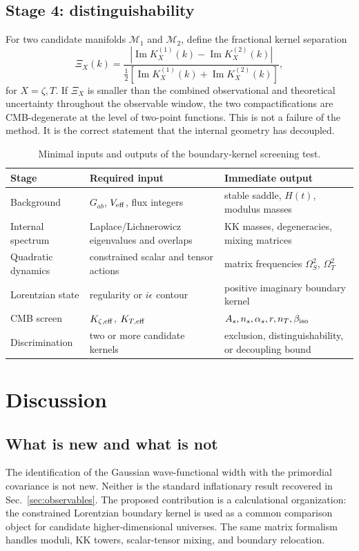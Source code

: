 \documentclass[aps,prd,twocolumn,superscriptaddress,nofootinbib,longbibliography,floatfix]{revtex4-2}
\newcommand{\cM}{\mathcal M}
\begin{document}
\subsection{Stage 4: distinguishability}
For two candidate manifolds $\cM_1$ and $\cM_2$, define the fractional kernel separation
\begin{equation}
\Xi_X(k)=\frac{\left|\operatorname{Im}K_X^{(1)}(k)-
\operatorname{Im}K_X^{(2)}(k)\right|}
{\frac12\left[\operatorname{Im}K_X^{(1)}(k)+
\operatorname{Im}K_X^{(2)}(k)\right]},
\end{equation}
for $X=\zeta,T$. If $\Xi_X$ is smaller than the combined observational and theoretical uncertainty throughout the observable window, the two compactifications are CMB-degenerate at the level of two-point functions. This is not a failure of the method. It is the correct statement that the internal geometry has decoupled.

\begin{table}[tbp]
\caption{Minimal inputs and outputs of the boundary-kernel screening test.}
\begin{ruledtabular}
\begin{tabular}{lll}
Stage & Required input & Immediate output\\
\hline
Background & $G_{ab}$, $V_{\rm eff}$, flux integers & stable saddle, $H(t)$, modulus masses\\
Internal spectrum & Laplace/Lichnerowicz eigenvalues and overlaps & KK masses, degeneracies, mixing matrices\\
Quadratic dynamics & constrained scalar and tensor actions & matrix frequencies $\Omega_S^2$, $\Omega_T^2$\\
Lorentzian state & regularity or $i\epsilon$ contour & positive imaginary boundary kernel\\
CMB screen & $K_{\zeta,\rm eff}$, $K_{T,\rm eff}$ & $A_s,n_s,\alpha_s,r,n_T,\beta_{\rm iso}$\\
Discrimination & two or more candidate kernels & exclusion, distinguishability, or decoupling bound\\
\end{tabular}
\end{ruledtabular}
\end{table}

\section{Discussion}
\label{sec:discussion}

\subsection{What is new and what is not}
The identification of the Gaussian wave-functional width with the primordial covariance is not new. Neither is the standard inflationary result recovered in Sec.~\ref{sec:observables}. The proposed contribution is a calculational organization: the constrained Lorentzian boundary kernel is used as a common comparison object for candidate higher-dimensional universes. The same matrix formalism handles moduli, KK towers, scalar-tensor mixing, and boundary relocation.
\end{document}
